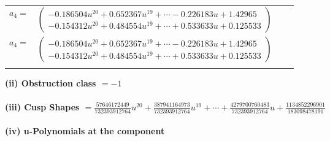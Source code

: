 \documentclass[1p]{elsarticle_modified}
\theoremstyle{definition}
\begin{document}
\begin{tabular}{m{7pt} m{180pt} m{7pt} m{180pt} }
\flushright $a_{4}=$&$\begin{pmatrix}-0.186504 u^{20}+0.652367 u^{19}+\cdots-0.226183 u+1.42965\\-0.154312 u^{20}+0.484554 u^{19}+\cdots+0.533633 u+0.125533\end{pmatrix}$\\ \flushright $a_{4}=$&$\begin{pmatrix}-0.186504 u^{20}+0.652367 u^{19}+\cdots-0.226183 u+1.42965\\-0.154312 u^{20}+0.484554 u^{19}+\cdots+0.533633 u+0.125533\end{pmatrix}$\\&\end{tabular}
\flushleft \textbf{(ii) Obstruction class $= -1$}\\~\\
\flushleft \textbf{(iii) Cusp Shapes $= \frac{57646172449}{732393912764} u^{20}+\frac{387941164973}{732393912764} u^{19}+\cdots+\frac{4279700760483}{732393912764} u+\frac{1134852296901}{183098478191}$}\\~\\
\newpage\renewcommand{\arraystretch}{1}
\flushleft \textbf{(iv) u-Polynomials at the component}\newline \\
\end{document}
